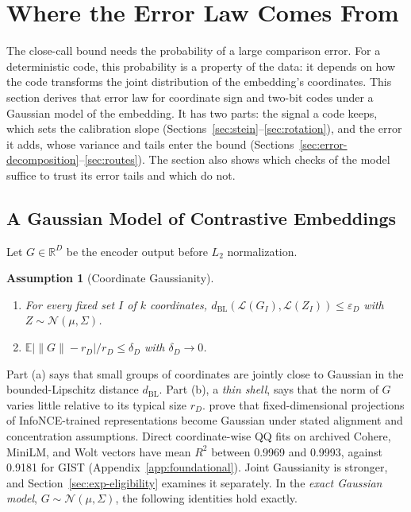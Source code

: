 \documentclass[twoside,11pt]{article}
\newtheorem{assumption}{Assumption}
\newcommand{\E}{\mathbb{E}}
\newcommand{\R}{\mathbb{R}}
\begin{document}
\section{Where the Error Law Comes From}
\label{sec:bridge}

The close-call bound needs the probability of a large comparison error. For a deterministic code, this probability is a property of the data: it depends on how the code transforms the joint distribution of the embedding's coordinates. This section derives that error law for coordinate sign and two-bit codes under a Gaussian model of the embedding. It has two parts: the signal a code keeps, which sets the calibration slope (Sections~\ref{sec:stein}--\ref{sec:rotation}), and the error it adds, whose variance and tails enter the bound (Sections~\ref{sec:error-decomposition}--\ref{sec:routes}). The section also shows which checks of the model suffice to trust its error tails and which do not.

\subsection{A Gaussian Model of Contrastive Embeddings}
\label{sec:gaussian-model}

Let $G\in\R^D$ be the encoder output before $L_2$ normalization.

\begin{assumption}[Coordinate Gaussianity]
\label{asm:H1}
\begin{enumerate}
\setlength{\itemsep}{2pt}
\setlength{\parsep}{0pt}
\item[(a)] For every fixed set $I$ of $k$ coordinates, $d_{\mathrm{BL}}(\mathcal L(G_I),\mathcal L(Z_I))\le\varepsilon_D$ with $Z\sim\mathcal N(\mu,\Sigma)$.
\item[(b)] $\E\bigl|\|G\|-r_D\bigr|/r_D\le\delta_D$ with $\delta_D\to0$.
\end{enumerate}
\end{assumption}

Part (a) says that small groups of coordinates are jointly close to Gaussian in the bounded-Lipschitz distance $d_{\mathrm{BL}}$. Part (b), a \emph{thin shell}, says that the norm of $G$ varies little relative to its typical size $r_D$. \citet{betser2026infonce} prove that fixed-dimensional projections of InfoNCE-trained representations become Gaussian under stated alignment and concentration assumptions. Direct coordinate-wise QQ fits on archived Cohere, MiniLM, and Wolt vectors have mean $R^2$ between 0.9969 and 0.9993, against 0.9181 for GIST (Appendix~\ref{app:foundational}). Joint Gaussianity is stronger, and Section~\ref{sec:exp-eligibility} examines it separately. In the \emph{exact Gaussian model}, $G\sim\mathcal N(\mu,\Sigma)$, the following identities hold exactly.
\end{document}

